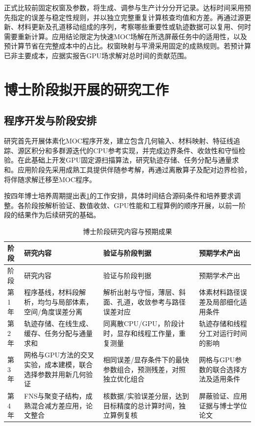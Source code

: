 \documentclass[UTF8, zihao=-4, fontset=none, a4paper]{ctexart}
\begin{document}
正式比较前固定权窗及参数，将生成、调参与生产计分分开记录。达标时间采用预先指定的误差与稳定性规则，并以独立完整重复计算核查均值和方差。再通过源更新、材料更新及孔道移动组成的序列，考察哪些重要性或轨迹数据可以复用、何时需要重新计算。应用结论限定为快速MOC场解在所选屏蔽任务中的适用性，以及预计算节省在完整成本中的占比。权窗映射与平滑采用固定的成熟规则。若预计算已非主要成本，应据实报告GPU场求解对总时间的贡献范围。


\section{博士阶段拟开展的研究工作}\label{sec:6}

\subsection{程序开发与阶段安排}

研究首先开展体素化MOC程序开发，建立包含几何输入、材料映射、特征线追踪、源区积分和多群源迭代的CPU参考实现，并完成边界条件、收敛性和守恒检验。在此基础上开发GPU固定源扫描算法，研究轨迹存储、任务分配与通量求和。应用阶段先采用成熟工具提供伴随参考解，再通过离散算子及配对边界检验，将伴随求解迁移至MOC程序。

按四年博士培养周期提出表\ref{tab:6}的工作安排，具体时间结合源码条件和培养要求调整。各阶段按解析验证、数值收敛、GPU性能和工程算例的顺序开展，以前一阶段的结果作为后续研究的基础。

\begin{longtable}{@{}>{\raggedright\arraybackslash}p{}>{\raggedright\arraybackslash}p{}>{\raggedright\arraybackslash}p{}>{\raggedright\arraybackslash}p{}@{}}
\caption{博士阶段研究内容与预期成果}\label{tab:6}\\
\toprule
阶段 & 研究内容 & 验证与阶段判据 & 预期学术产出 \\
\midrule
\endfirsthead
\toprule
阶段 & 研究内容 & 验证与阶段判据 & 预期学术产出 \\
\midrule
\endhead
\bottomrule
\endlastfoot
第1年 & 程序基线，材料段解析，均匀与局部体素，空间/角度误差分离 & 解析出射与守恒，薄层、斜面、孔道，收敛参考与路径误差对应 & 体素材料路径误差及局部细化适用条件 \\
第2年 & 轨迹存储、在线生成、缓存、任务分配与通量求和 & 同离散CPU/GPU，阶段计时，显存和线程工作量，重复测量 & 轨迹存储和线程分工对运行时间的影响 \\
第3年 & 网格与GPU方法的交叉实验，成本建模，联合选择参数并用新几何验证 & 相同误差/显存条件下的最快参数组合，预测残差，对照独立优化组合 & 网格与GPU参数的联合选择方法及适用条件 \\
第4年 & FNS与聚变子结构，成熟混合减方差应用，论文整合 & 核数据/实验误差分层，达到目标精度的总计算时间，独立算例复核 & 屏蔽验证、应用证据与博士学位论文 \\
\end{longtable}
\end{document}
